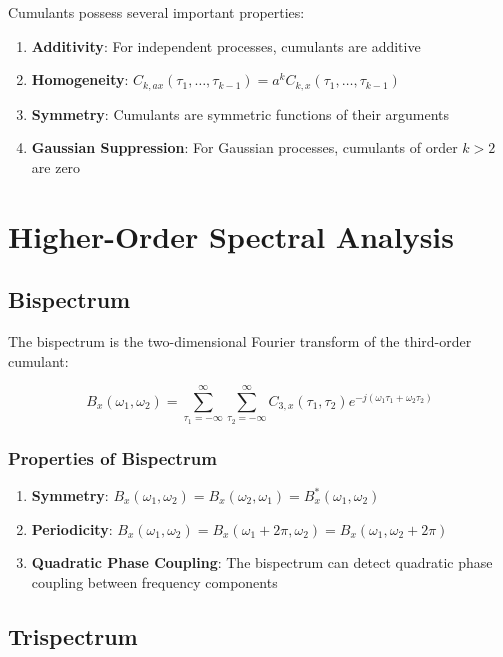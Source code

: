 Cumulants possess several important properties:

\begin{enumerate}
    \item \textbf{Additivity}: For independent processes, cumulants are additive
    \item \textbf{Homogeneity}: $C_{k,ax}(\tau_1, \ldots, \tau_{k-1}) = a^k C_{k,x}(\tau_1, \ldots, \tau_{k-1})$
    \item \textbf{Symmetry}: Cumulants are symmetric functions of their arguments
    \item \textbf{Gaussian Suppression}: For Gaussian processes, cumulants of order $k > 2$ are zero
\end{enumerate}

\section{Higher-Order Spectral Analysis}

\subsection{Bispectrum}

The bispectrum is the two-dimensional Fourier transform of the third-order cumulant:

\begin{equation}
B_x(\omega_1, \omega_2) = \sum_{\tau_1=-\infty}^{\infty} \sum_{\tau_2=-\infty}^{\infty} C_{3,x}(\tau_1, \tau_2) e^{-j(\omega_1\tau_1 + \omega_2\tau_2)}
\end{equation}

\subsubsection{Properties of Bispectrum}

\begin{enumerate}
    \item \textbf{Symmetry}: $B_x(\omega_1, \omega_2) = B_x(\omega_2, \omega_1) = B_x^*(\omega_1, \omega_2)$
    \item \textbf{Periodicity}: $B_x(\omega_1, \omega_2) = B_x(\omega_1 + 2\pi, \omega_2) = B_x(\omega_1, \omega_2 + 2\pi)$
    \item \textbf{Quadratic Phase Coupling}: The bispectrum can detect quadratic phase coupling between frequency components
\end{enumerate}

\subsection{Trispectrum}

